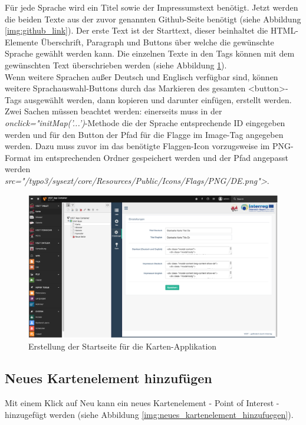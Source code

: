 Für jede Sprache wird ein Titel sowie der Impressumstext benötigt. Jetzt werden die beiden Texte aus der zuvor genannten Github-Seite benötigt (siehe Abbildung \ref{img:github_link}). Der erste Text ist der Starttext, dieser beinhaltet die HTML-Elemente Überschrift, Paragraph und Buttons über welche die gewünschte Sprache gewählt werden kann. Die einzelnen Texte in den Tags können mit dem gewünschten Text überschrieben werden (siehe Abbildung \ref{img:befuellte_startseite_karte}).\\
Wenn weitere Sprachen außer Deutsch und Englisch verfügbar sind, können weitere Sprachauswahl-Buttons durch das Markieren des gesamten <button>-Tags ausgewählt werden, dann kopieren und darunter einfügen, erstellt werden. Zwei Sachen müssen beachtet werden: einerseits muss in der \textit{onclick="initMap('...')}-Methode die der Sprache entsprechende ID eingegeben werden und für den Button der Pfad für die Flagge im Image-Tag angegeben werden. Dazu muss zuvor im das benötigte Flaggen-Icon vorzugsweise im PNG-Format im entsprechenden Ordner gespeichert werden und der Pfad angepasst werden\\ \textit{src="/typo3/sysext/core/Resources/Public/Icons/Flags/PNG/DE.png">}. 

\begin{figure}[ht!]
\centering
\includegraphics[width=12cm]{Figures/paula/karte/befuellte_startseite_karte.png}
\caption{Erstellung der Startseite für die Karten-Applikation}
\label{img:befuellte_startseite_karte}
\end{figure}

\subsection{Neues Kartenelement hinzufügen}

Mit einem Klick auf \glqq Neu\grqq{} kann ein neues Kartenelement - Point of Interest - hinzugefügt werden (siehe Abbildung \ref{img:neues_kartenelement_hinzufuegen}).

